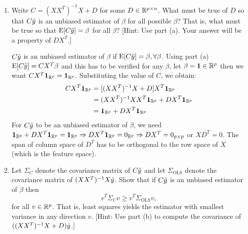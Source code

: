 \documentclass[12pt,twoside]{article}
\begin{document}
\begin{enumerate}
\begin{enumerate}
  \item Write $C=(XX^T)^{-1}X+D$ for some $D\in\mathbb{R}^{p\times n}$.
    What must be true of $D$ so that $C\tilde{  y }$ is an unbiased estimator
    of $\beta$ for all possible $\beta$?  That is, what must be true
    so that $\mathrm{E}[C\tilde{  y }]=\beta$ for all $\beta$? [Hint: Use part (a).
    Your answer will be a property of $DX^T$.]\\
    \medskip
    
    $C\tilde{  y }$ is an unbiased estimator of $\beta$ if  $\mathrm{E}[C\tilde{  y }]=\beta, \forall \beta$. Using part (a)
    $\mathrm{E}[C\tilde{  y }] =C X^T \beta$ and this has to be verified for any $\beta$, let $\beta =\bm{1} \in \mathbb{R}^p$ then we want $C X^T \bm{1}_{\mathbb{R}^p} = \bm{1}_{\mathbb{R}^p} $.
    Substituting the value of $C$, we obtain:
    \begin{align*}
    	  C X^T \bm{1}_{\mathbb{R}^p}	&=	[(XX^T)^{-1}X+D] X^T \bm{1}_{\mathbb{R}^p}\\
	  					&=	(XX^T)^{-1} X X^T \bm{1}_{\mathbb{R}^p} + D X^T \bm{1}_{\mathbb{R}^p}\\
						&=	\bm{1}_{\mathbb{R}^p} + D X^T \bm{1}_{\mathbb{R}^p}
    \end{align*}
    For $C\tilde{  y }$ to be an unbiased estimator of $\beta$, 
    we need $\bm{1}_{\mathbb{R}^p} + D X^T \bm{1}_{\mathbb{R}^p} =  \bm{1}_{\mathbb{R}^p} \Rightarrow D X^T \bm{1}_{\mathbb{R}^p}  = 0_{\mathbb{R}^p} \Rightarrow D X^T= 0_{p \times p}$ or $X D^T = 0$. 
    The span of column space of $D^T$ has to be orthogonal to the row space of $X$ (which is the feature space).

    
   \item Let $\Sigma_C$ denote the covariance matrix of $C\tilde{  y }$ and let
    $\Sigma_{\text{OLS}}$ denote the covariance matrix of $(XX^T)^{-1}X \tilde{  y }$.
    Show that if $C\tilde{  y }$ is an unbiased estimator of $\beta$ then
    $$v^T\Sigma_Cv \geq v^T\Sigma_{\text{OLS}}v,$$
    for all $v\in\mathbb{R}^p$.  That is, least squares yields
    the estimator with smallest variance in any direction
    $v$. [Hint: Use part (b) to compute the covariance of
      $((XX^T)^{-1}X+D)\tilde{  y }$.]\\
      

\end{enumerate}
\end{enumerate}
\end{document}
